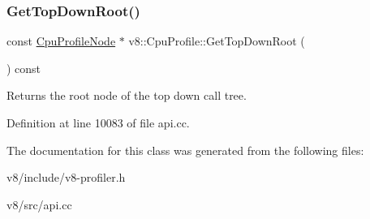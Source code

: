 \subsubsection{\texorpdfstring{Get\+Top\+Down\+Root()}{GetTopDownRoot()}}
{\footnotesize\ttfamily const \mbox{\hyperlink{classv8_1_1CpuProfileNode}{Cpu\+Profile\+Node}} $\ast$ v8\+::\+Cpu\+Profile\+::\+Get\+Top\+Down\+Root (\begin{DoxyParamCaption}{ }\end{DoxyParamCaption}) const}

Returns the root node of the top down call tree. 

Definition at line 10083 of file api.\+cc.



The documentation for this class was generated from the following files\+:\begin{DoxyCompactItemize}
\item 
v8/include/v8-\/profiler.\+h\item 
v8/src/api.\+cc\end{DoxyCompactItemize}
